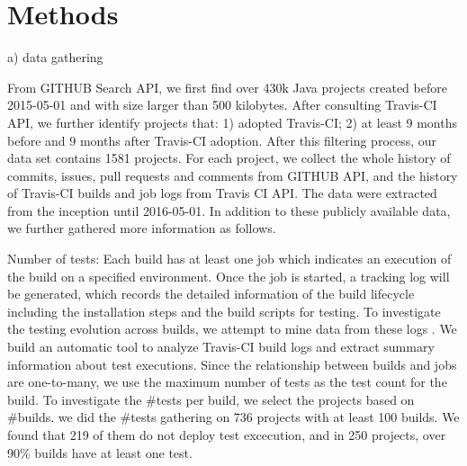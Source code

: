 \section{Methods}
\label{sec:method}

a) data gathering

From GITHUB Search API, we first find over 430k Java projects created before 2015-05-01 and with size larger than 500 kilobytes. After consulting Travis-CI API, we further identify projects that: 1) adopted Travis-CI; 2) at least 9 months before and 9 months after Travis-CI adoption. After this filtering process, our data set contains 1581 projects.  
For each project, we collect the whole history of commits, issues, pull requests and comments from GITHUB API, and the history of Travis-CI builds and job logs from Travis CI API.  The data were extracted from the inception until 2016-05-01. 
In addition to these publicly available data, we further gathered more information as follows.

Number of tests: 
Each build has at least one job which indicates an execution of the build on a specified environment. Once the job is started, a tracking log will be generated, which records the detailed information of the build lifecycle including the installation steps and the build scripts for testing. To investigate the testing evolution across builds, we attempt to mine data from these logs . We build an automatic tool to analyze Travis-CI build logs and extract summary information about test executions. 
Since the relationship between builds and jobs are one-to-many, we use the maximum number of tests as the test count for the build. 
To investigate the \#tests per build, we select the projects based on \#builds.  we did the \#tests gathering on 736 projects with at least 100 builds. We found that 219 of them do not deploy test excecution, and in 250 projects, over 90\% builds have at least one test. 

